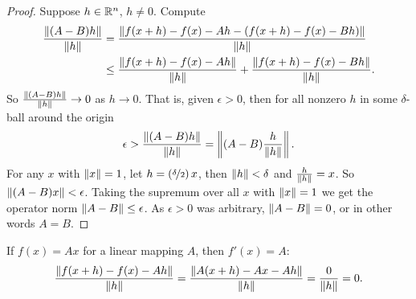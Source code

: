 \begin{proof}
Suppose $h \in {\mathbb{R}}^n$, $h \not= 0$.  Compute
\begin{equation*}
\begin{split}
\frac{\lVert {(A-B)h} \rVert}{\lVert {h} \rVert} & =
\frac{\lVert {f(x+h)-f(x) - Ah - (f(x+h)-f(x) - Bh)} \rVert}{\lVert {h} \rVert} \\
& \leq
\frac{\lVert {f(x+h)-f(x) - Ah} \rVert}{\lVert {h} \rVert} + \frac{\lVert {f(x+h)-f(x) -
Bh} \rVert}{\lVert {h} \rVert} .
\end{split}
\end{equation*}
So 
$\frac{\lVert {(A-B)h} \rVert}{\lVert {h} \rVert} \to 0$ as $h \to 0$.  That is, given
$\epsilon > 0$, then for all nonzero $h$ in some $\delta$-ball around
the origin
\begin{equation*}
\epsilon > 
\frac{\lVert {(A-B)h} \rVert}{\lVert {h} \rVert}
=
\left\lVert {(A-B)\frac{h}{\lVert {h} \rVert}} \right\rVert .
\end{equation*}
For any $x$ with $\lVert {x} \rVert=1$,
let $h = (\nicefrac{\delta}{2}) \, x$, then $\lVert {h} \rVert < \delta$
and $\frac{h}{\lVert {h} \rVert} = x$.
So $\lVert {(A-B)x} \rVert < \epsilon$.  Taking the supremum over all $x$ with
$\lVert {x} \rVert = 1$ we get the operator norm
$\lVert {A-B} \rVert \leq \epsilon$.  As $\epsilon > 0$
was arbitrary, $\lVert {A-B} \rVert = 0$, or in other words $A = B$.
\end{proof}

\begin{example}
If $f(x) = Ax$ for a linear mapping $A$, then
$f'(x) = A$:
\begin{equation*}
\frac{\lVert {f(x+h)-f(x) - Ah} \rVert}{\lVert {h} \rVert}
=
\frac{\lVert {A(x+h)-Ax - Ah} \rVert}{\lVert {h} \rVert}
=
\frac{0}{\lVert {h} \rVert} = 0 .
\end{equation*}
\end{example}

